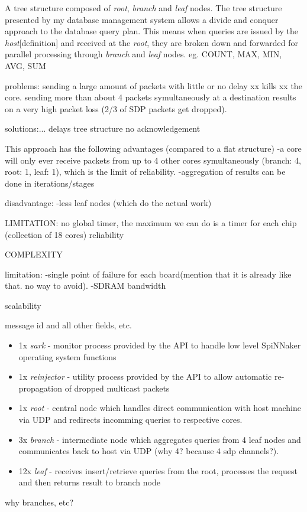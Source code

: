 A tree structure composed of \textit{root}, \textit{branch} and \textit{leaf} nodes. The tree structure presented by my database management system allows a divide and conquer approach to the database query plan. This means when queries are issued by the \textit{host}[definition] and received at the \textit{root}, they are broken down and forwarded for parallel processing through \textit{branch} and \textit{leaf} nodes. eg. COUNT, MAX, MIN, AVG, SUM

problems:
sending a large amount of packets with little or no delay xx kills xx the core. sending more than about 4 packets symultaneously at a destination results on a very high packet loss (2/3 of SDP packets get dropped).


solutions:...
delays
tree structure
no acknowledgement


This approach has the following advantages (compared to a flat structure)
-a core will only ever receive packets from up to 4 other cores symultaneously (branch: 4, root: 1, leaf: 1), which is the limit of reliability.
-aggregation of results can be done in iterations/stages

disadvantage:
-less leaf nodes (which do the actual work)

LIMITATION:
no global timer, the maximum we can do is a timer for each chip (collection of 18 cores)
reliability

COMPLEXITY

limitation:
-single point of failure for each board(mention that it is already like that. no way to avoid).
-SDRAM bandwidth

scalability

message id and all other fields, etc.

\begin{itemize}
\item 1x \textit{sark} - monitor process provided by the API to handle low level SpiNNaker operating system functions
\item 1x \textit{reinjector} - utility process provided by the API to allow automatic re-propagation of dropped multicast packets
\item 1x \textit{root} - central node which handles direct communication with host machine via UDP and redirects incomming queries to respective cores. 
\item 3x \textit{branch} - intermediate node which aggregates queries from 4 leaf nodes and communicates back to host via UDP (why 4? because 4 sdp channels?). 
\item 12x \textit{leaf} - receives insert/retrieve queries from the root, processes the request and then returns result to branch node
\end{itemize}
why branches, etc?

